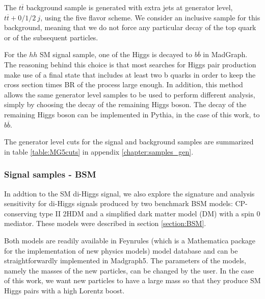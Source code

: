
The $t\overline{t}$ background sample is generated with extra jets at generator level, $t\overline{t}+0/1/2 ~j$, using the five flavor scheme. We consider an inclusive sample for this background, meaning that we do not force any particular decay of the top quark or of the subsequent particles.
 
For the $hh$ SM signal sample, one of the Higgs is decayed to $b\overline{b}$ in MadGraph. The reasoning behind this choice is that most searches for Higgs pair production make use of a final state that includes at least two b quarks in order to keep the cross section times BR of the process large enough. In addition, this method allows the same generator level samples to be used to perform different analysis, simply by choosing the decay of the remaining Higgs boson. The decay of the remaining Higgs boson can be implemented in Pythia, in the case of this work, to $b\overline{b}$.

The generator level cuts for the signal and background samples are summarized in table \ref{table:MG5cuts} in appendix \ref{chapter:samples_gen}. 

\subsubsection{Signal samples - BSM} 

In addtion to the SM di-Higgs signal, we also explore the signature and analysis sensitivity for di-Higgs signals produced by two benchmark BSM models: CP-conserving type II 2HDM and a simplified dark matter model (DM) with a spin 0 mediator. These models were described in section \ref{section:BSM}.

Both models are readily available in Feynrules \cite{Feynrules} (which is a Mathematica package for the implementation of new physics models) model database and can be straightforwardly implemented in Madgraph5. The parameters of the models, namely the masses of the new particles, can be changed by the user. In the case of this work, we want new particles to have a large mass so that they produce SM Higgs pairs with a high Lorentz boost. 

